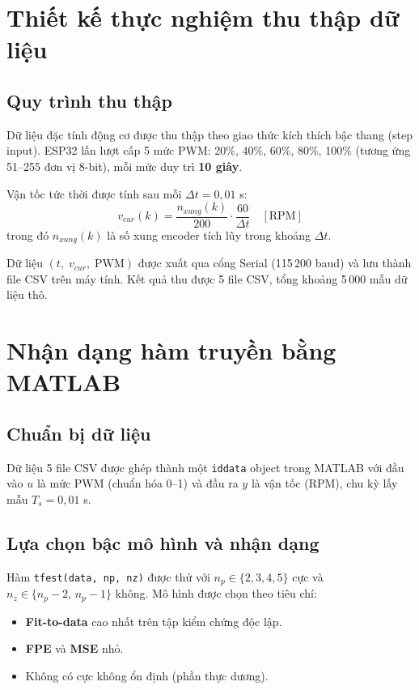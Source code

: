 \section{Thiết kế thực nghiệm thu thập dữ liệu}

\subsection{Quy trình thu thập}

Dữ liệu đặc tính động cơ được thu thập theo giao thức kích thích bậc thang
(step input). ESP32 lần lượt cấp 5 mức PWM: 20\%, 40\%, 60\%, 80\%, 100\%
(tương ứng 51--255 đơn vị 8-bit), mỗi mức duy trì \textbf{10 giây}.

Vận tốc tức thời được tính sau mỗi $\Delta t = 0{,}01$ s:
\begin{equation}
    v_{cur}(k) = \frac{n_{xung}(k)}{200} \cdot \frac{60}{\Delta t}
    \quad [\text{RPM}]
    \label{eq:vel_calc}
\end{equation}
trong đó $n_{xung}(k)$ là số xung encoder tích lũy trong khoảng $\Delta t$.

Dữ liệu $(t,\; v_{cur},\; \text{PWM})$ được xuất qua cổng Serial (115\,200
baud) và lưu thành file CSV trên máy tính. Kết quả thu được 5 file CSV,
tổng khoảng 5\,000 mẫu dữ liệu thô.


\section{Nhận dạng hàm truyền bằng MATLAB}

\subsection{Chuẩn bị dữ liệu}

Dữ liệu 5 file CSV được ghép thành một \texttt{iddata} object trong MATLAB với
đầu vào $u$ là mức PWM (chuẩn hóa 0--1) và đầu ra $y$ là vận tốc (RPM),
chu kỳ lấy mẫu $T_s = 0{,}01$ s.

\subsection{Lựa chọn bậc mô hình và nhận dạng}

Hàm \texttt{tfest(data, np, nz)} được thử với $n_p \in \{2,3,4,5\}$ cực và
$n_z \in \{n_p{-}2,\, n_p{-}1\}$ không. Mô hình được chọn theo tiêu chí:
\begin{itemize}
    \item \textbf{Fit-to-data} cao nhất trên tập kiểm chứng độc lập.
    \item \textbf{FPE} và \textbf{MSE} nhỏ.
    \item Không có cực không ổn định (phần thực dương).
\end{itemize}


